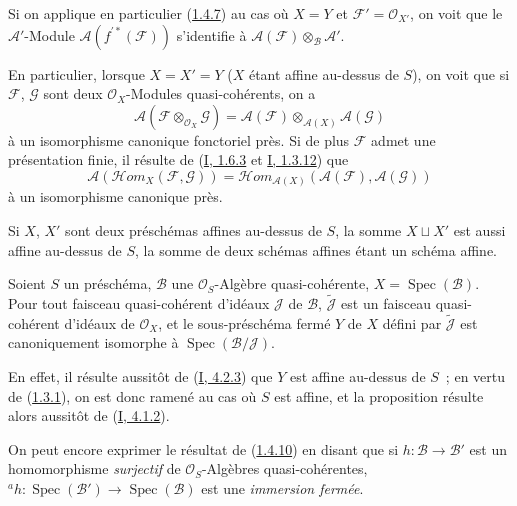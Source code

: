 Si on applique en particulier (\hyperref[II.1.4.7-fr]{1.4.7}) au cas où
$X=Y$ et $\mathcal{F}'=\mathcal{O}_{X'}$, on voit que le
$\mathcal{A}'$-Module $\mathcal{A}(f^{\prime*}(\mathcal{F}))$ s'identifie à
$\mathcal{A}(\mathcal{F})\otimes_{\mathcal{B}}\mathcal{A}'$.

\begin{env}[1.4.8]
\label{II.1.4.8-fr}
En particulier, lorsque $X=X'=Y$ ($X$ étant affine au-dessus de $S$), on voit
que si $\mathcal{F}$, $\mathcal{G}$ sont deux $\mathcal{O}_X$-Modules
quasi-cohérents, on a
\[
  \mathcal{A}(\mathcal{F}\otimes_{\mathcal{O}_X}\mathcal{G})
  =\mathcal{A}(\mathcal{F})\otimes_{\mathcal{A}(X)}\mathcal{A}(\mathcal{G})
  \tag{1.4.8.1}\label{II.1.4.8.1-fr}
\]
à un isomorphisme canonique fonctoriel près. Si de plus $\mathcal{F}$ admet
une présentation finie, il résulte de
(\hyperref[I.1.6.3-fr]{I, 1.6.3} et
\hyperref[I.1.3.12-fr]{I, 1.3.12}) que
\[
  \mathcal{A}(\mathcal{H}om_X(\mathcal{F},\mathcal{G}))
  =\mathcal{H}om_{\mathcal{A}(X)}
    (\mathcal{A}(\mathcal{F}),\mathcal{A}(\mathcal{G}))
  \tag{1.4.8.2}\label{II.1.4.8.2-fr}
\]
à un isomorphisme canonique près.
\end{env}

\begin{remark}[1.4.9]
\label{II.1.4.9-fr}
Si $X$, $X'$ sont deux préschémas affines au-dessus de $S$, la somme
$X\sqcup X'$ est aussi affine au-dessus de $S$, la somme de deux schémas
affines étant un schéma affine.
\end{remark}

\begin{proposition}[1.4.10]
\label{II.1.4.10-fr}
Soient $S$ un préschéma, $\mathcal{B}$ une $\mathcal{O}_S$-Algèbre
quasi-cohérente, $X=\operatorname{Spec}(\mathcal{B})$. Pour tout faisceau
quasi-cohérent d'idéaux $\mathcal{J}$ de $\mathcal{B}$,
$\widetilde{\mathcal{J}}$ est un faisceau quasi-cohérent d'idéaux de
$\mathcal{O}_X$, et le sous-préschéma fermé $Y$ de $X$ défini par
$\widetilde{\mathcal{J}}$ est canoniquement isomorphe à
$\operatorname{Spec}(\mathcal{B}/\mathcal{J})$.
\end{proposition}

En effet, il résulte aussitôt de (\hyperref[I.4.2.3-fr]{I, 4.2.3}) que $Y$
est affine au-dessus de $S$~; en vertu de
(\hyperref[II.1.3.1-fr]{1.3.1}), on est donc ramené au cas où $S$ est affine,
et la proposition résulte alors aussitôt de
(\hyperref[I.4.1.2-fr]{I, 4.1.2}).

On peut encore exprimer le résultat de
(\hyperref[II.1.4.10-fr]{1.4.10}) en disant que si
$h:\mathcal{B}\to\mathcal{B}'$ est un homomorphisme \emph{surjectif} de
$\mathcal{O}_S$-Algèbres quasi-cohérentes,
${}^a h:\operatorname{Spec}(\mathcal{B}')\to
\operatorname{Spec}(\mathcal{B})$ est une \emph{immersion fermée}.

